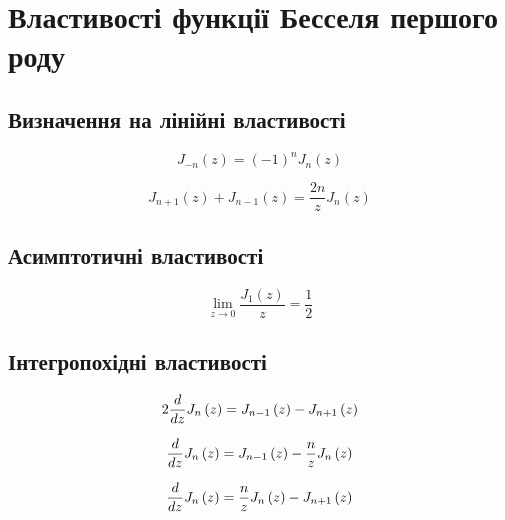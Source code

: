 \chapter{Властивості функції Бесселя першого роду}
\label{ch:bessel}

\section{Визначення на лінійні властивості}

\begin{equation}
J_{-n} \left( z \right) = \left( -1 \right)^n J_n \left( z \right)
\end{equation}

\begin{equation}
J_{n+1} \left( z \right) + J_{n-1} \left( z \right) = 
\frac{2n}{z} J_n \left( z \right)
\end{equation}

\section{Асимптотичні властивості}
%
\begin{equation} \label{eq:limJ1toZ}
\lim_{z \to 0} \left. \frac{J_1 \left( z \right)}{z} \right. = \frac{1}{2}
\end{equation}

\section{Інтегропохідні властивості}
%
\begin{equation}
2 \frac{d }{d z} J_n \left( z \right) = 
J_{n-1} \left( z \right) - J_{n+1} \left( z \right) 
\end{equation}

\begin{equation}
\frac{d }{d z} J_n \left( z \right) = 
J_{n-1} \left( z \right) - \frac{n}{z} J_{n} \left( z \right) 
\end{equation}

\begin{equation}
\frac{d }{d z} J_n \left( z \right) = 
\frac{n}{z} J_{n} \left( z \right) - J_{n+1} \left( z \right) 
\end{equation}

